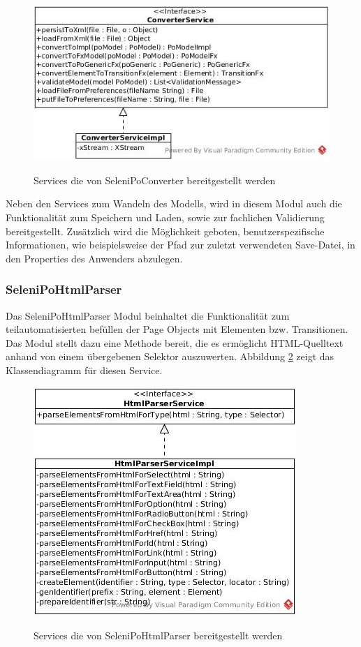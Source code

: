 \begin{figure}[htb]
  \centering  
  \includegraphics[scale=0.5]{img/ConverterService.jpg}\\
  \caption{Services die von SeleniPoConverter bereitgestellt werden}
  \label{fig:converter_service}
\end{figure}

Neben den Services zum Wandeln des Modells, wird in diesem Modul auch die Funktionalität zum Speichern und Laden, sowie zur fachlichen Validierung bereitgestellt.
Zusätzlich wird die Möglichkeit geboten, benutzerspezifische Informationen, wie beispielsweise der Pfad zur zuletzt verwendeten Save-Datei, in den Properties des Anwenders abzulegen.


\subsubsection{SeleniPoHtmlParser}
\label{sec:selenipohtmlparser}

Das SeleniPoHtmlParser Modul beinhaltet die Funktionalität zum teilautomatisierten befüllen der Page Objects mit Elementen bzw. Transitionen.
Das Modul stellt dazu eine Methode bereit, die es ermöglicht HTML-Quelltext anhand von einem übergebenen Selektor auszuwerten.
Abbildung \ref{fig:html_service} zeigt das Klassendiagramm für diesen Service.

\begin{figure}[htb]
  \centering  
  \includegraphics[scale=0.5]{img/HtmlParserService.jpg}\\
  \caption{Services die von SeleniPoHtmlParser bereitgestellt werden}
  \label{fig:html_service}
\end{figure}

